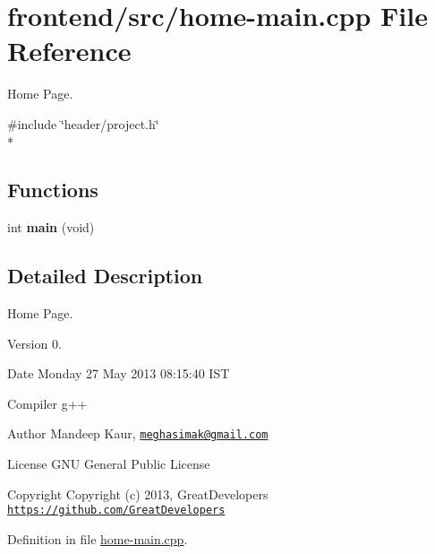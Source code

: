 \hypertarget{home-main_8cpp}{\section{frontend/src/home-\/main.cpp File Reference}
\label{home-main_8cpp}
}


Home Page.  


{\ttfamily \#include \char`\"{}header/project.\-h\char`\"{}}\\*
\subsection*{Functions}
\begin{DoxyCompactItemize}
\item 
\hypertarget{home-main_8cpp_a840291bc02cba5474a4cb46a9b9566fe}{int {\bfseries main} (void)}\label{home-main_8cpp_a840291bc02cba5474a4cb46a9b9566fe}

\end{DoxyCompactItemize}


\subsection{Detailed Description}
Home Page. \begin{DoxyVersion}{Version}
0. 
\end{DoxyVersion}
\begin{DoxyDate}{Date}
Monday 27 May 2013 08\-:15\-:40 I\-S\-T\par
Compiler g++
\end{DoxyDate}
\begin{DoxyAuthor}{Author}
Mandeep Kaur, \href{mailto:meghasimak@gmail.com}{\tt meghasimak@gmail.\-com}\par
License G\-N\-U General Public License 
\end{DoxyAuthor}
\begin{DoxyCopyright}{Copyright}
Copyright (c) 2013, Great\-Developers \href{https://github.com/GreatDevelopers}{\tt https\-://github.\-com/\-Great\-Developers} 
\end{DoxyCopyright}


Definition in file \hyperlink{home-main_8cpp_source}{home-\/main.\-cpp}.

